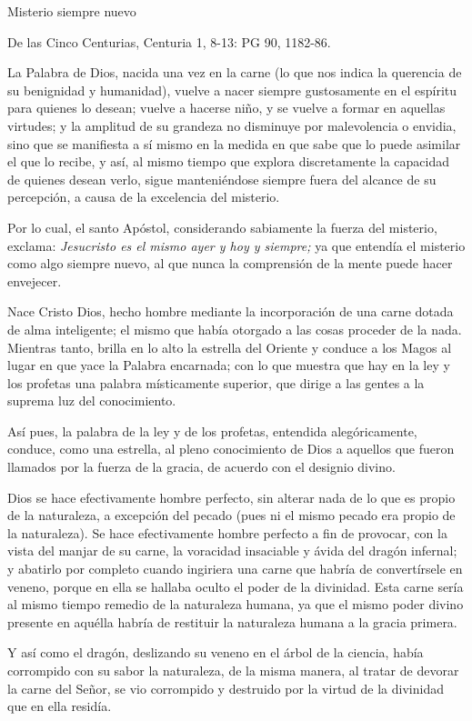 Misterio siempre nuevo

De las Cinco Centurias, Centuria 1, 8-13: PG 90, 1182-86.

La Palabra de Dios, nacida una vez en la carne (lo que nos indica la querencia de su benignidad y humanidad), vuelve a nacer siempre gustosamente en el espíritu para quienes lo desean; vuelve a hacerse niño, y se vuelve a formar en aquellas virtudes; y la amplitud de su grandeza no disminuye por malevolencia o envidia, sino que se manifiesta a sí mismo en la medida en que sabe que lo puede asimilar el que lo recibe, y así, al mismo tiempo que explora discretamente la capacidad de quienes desean verlo, sigue manteniéndose siempre fuera del alcance de su percepción, a causa de la excelencia del misterio.

Por lo cual, el santo Apóstol, considerando sabiamente la fuerza del misterio, exclama: \emph{Jesucristo es el mismo ayer y hoy y siempre;} ya que entendía el misterio como algo siempre nuevo, al que nunca la comprensión de la mente puede hacer envejecer.

Nace Cristo Dios, hecho hombre mediante la incorporación de una carne dotada de alma inteligente; el mismo que había otorgado a las cosas proceder de la nada. Mientras tanto, brilla en lo alto la estrella del Oriente y conduce a los Magos al lugar en que yace la Palabra encarnada; con lo que muestra que hay en la ley y los profetas una palabra místicamente superior, que dirige a las gentes a la suprema luz del conocimiento.

Así pues, la palabra de la ley y de los profetas, entendida alegóricamente, conduce, como una estrella, al pleno conocimiento de Dios a aquellos que fueron llamados por la fuerza de la gracia, de acuerdo con el designio divino.

Dios se hace efectivamente hombre perfecto, sin alterar nada de lo que es propio de la naturaleza, a excepción del pecado (pues ni el mismo pecado era propio de la naturaleza). Se hace efectivamente hombre perfecto a fin de provocar, con la vista del manjar de su carne, la voracidad insaciable y ávida del dragón infernal; y abatirlo por completo cuando ingiriera una carne que habría de convertírsele en veneno, porque en ella se hallaba oculto el poder de la divinidad. Esta carne sería al mismo tiempo remedio de la naturaleza humana, ya que el mismo poder divino presente en aquélla habría de restituir la naturaleza humana a la gracia primera.

Y así como el dragón, deslizando su veneno en el árbol de la ciencia, había corrompido con su sabor la naturaleza, de la misma manera, al tratar de devorar la carne del Señor, se vio corrompido y destruido por la virtud de la divinidad que en ella residía.


